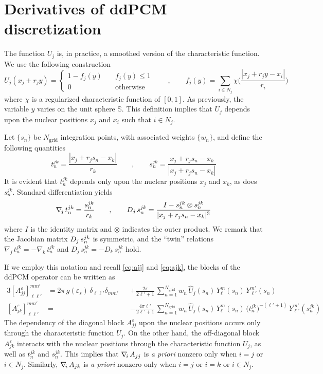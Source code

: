 \section{Derivatives of ddPCM discretization}\label{app:pcm_der}

The function $U_j$ is, in practice, a smoothed version of the characteristic function. We use the following construction
\[
U_j(x_j + r_j y) =
\begin{cases}
1 - f_j(y) 	&\quad f_j(y) \le 1\\
0		&\quad \text{otherwise}
\end{cases}
\qquad , \qquad 
f_j(y) = \sum_{i \in N_j} \chi \bigg(\frac{|x_j + r_j y - x_i|}{r_i}\bigg)
\]
where $\chi$ is a regularized characteristic function of $[0,1]$. As previously, the variable $y$ varies on the unit sphere $\mathbb{S}$. This definition implies that $U_j$ depends upon the nuclear positions $x_j$ and $x_i$ such that $i \in N_j$.



Let $\{ s_n\}$ be $N_\text{grid}$ integration points, with associated weights $\{ w_n \}$, and define the following quantities
\[
t_n^{jk} = \frac{|x_j + r_j s_n -x_k|}{r_k} \qquad , \qquad s_n^{jk} = \frac{x_j + r_j s_n -x_k}{|x_j + r_j s_n -x_k|}%
\]
It is evident that $t_n^{jk}$ depends only upon the nuclear positions $x_j$ and $x_k$, as does $s_n^{jk}$. Standard differentiation yields
\begin{equation}\label{eq:75}
\nabla_{\!j}\, t_n^{jk} = \frac{s_n^{jk}}{r_k} \qquad , \qquad D_j \, s_n^{jk} = \frac{I - s_n^{jk} \otimes s_n^{jk} }{|x_j + r_j s_n - x_k|^3}
\end{equation}
where $I$ is the identity matrix and $\otimes$ indicates the outer product. We remark that the Jacobian matrix $D_j \, s_n^{jk}$ is symmetric, and the ``twin'' relations $\nabla_{\! j} \, t_n^{jk} = - \nabla_{\! k} \, t_n^{jk}$ and $D_j \, s_n^{jk} = - D_k \, s_n^{jk}$ hold.

If we employ this notation and recall \eqref{eq:ajj} and \eqref{eq:ajk}, the blocks of the ddPCM operator can be written as
\begin{alignat*}{3}
{[A_{jj}^\varepsilon]}_{\ell \ell'}^{mm'}& = 2\pi \, g(\varepsilon_s) \, \delta_{\ell \ell'} \delta_{m m'}&& + \frac{2\pi}{2 \ell' + 1} \,\sum_{n= 1}^{N_\text{grid}} w_n \, \hat{U}_j(s_n)  \,Y_\ell^m(s_n) \,  Y_{\ell'}^{m'}(s_n) \\
{[A_{jk}^\varepsilon]}_{\ell \ell'}^{mm'}& =&& -  \frac{4 \pi \ell'}{2 \ell'+1} \, \sum_{n= 1}^{N_\text{grid}} w_n\, \hat{U}_j(s_n) \, Y_\ell^m(s_n) \, \big( t_n^{jk}\big)^{-(\ell'+1)} \, Y_{\ell'}^{m'} (s_n^{jk})
\end{alignat*}
The dependency of the diagonal block $A_{jj}^\varepsilon$ upon the nuclear positions occurs only through the characteristic function $U_j$. On the other hand, the off-diagonal block $A_{jk}^\varepsilon$ interacts with the nuclear positions through the characteristic function $U_j$, as well as $t_n^{jk}$ and $s_n^{jk}$. This implies that $\nabla_{\!i}\, A_{jj}$ is \emph{a priori} nonzero only when $i = j$ or $i \in N_j$. Similarly, $\nabla_{\!i}\, A_{jk}$ is \emph{a priori} nonzero only when $i = j$ or $i = k$ or $i \in N_j$.


